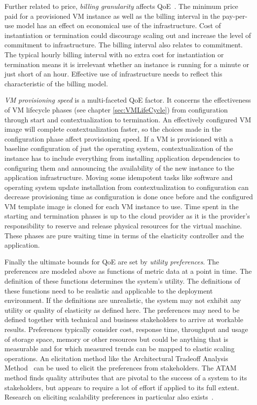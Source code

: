 \documentclass[english]{tktltiki2}
\theoremstyle{definition}
\theoremstyle{remark}
\begin{document}
Further related to price, \textit{billing granularity} affects
QoE~\cite{Brebner2012a}\cite{Islam2012}\cite{Mao2011}\cite{VandenBossche2010}.
The minimum price paid for a provisioned VM instance as well as the billing
interval in the pay-per-use model has an effect on economical use of the
infrastructure. Cost of instantiation or termination could discourage scaling
out and increase the level of commitment to infrastructure. The billing interval
also relates to commitment. The typical hourly billing interval with no extra
cost for instantiation or termination means it is irrelevant whether an instance
is running for a minute or just short of an hour. Effective use of
infrastructure needs to reflect this characteristic of the billing model.

\textit{VM provisioning speed} is a multi-faceted QoE factor. It concerns the
effectiveness of VM lifecycle phases (see chapter \ref{sec:VMLifeCycle}) from
configuration through start and contextualization to termination. An effectively
configured VM image will complete contextualization faster, so the choices made
in the configuration phase affect provisioning speed. If a VM is provisioned
with a baseline configuration of just the operating system, contextualization of
the instance has to include everything from installing application dependencies
to configuring them and announcing the availability of the new instance to the
application infrastructure. Moving some idempotent tasks like software and
operating system update installation from contextualization to configuration can
decrease provisioning time as configuration is done once before and the
configured VM template image is cloned for each VM instance to use. Time spent
in the starting and termination phases is up to the cloud provider as it is the
provider's responsibility to reserve and release physical resources for the
virtual machine. These phases are pure waiting time in terms of the elasticity
controller and the application.

Finally the ultimate bounds for QoE are set by \textit{utility preferences}. The
preferences are modeled above as functions of metric data at a point in time.
The definition of these functions determines the system's utility. The
definitions of these functions need to be realistic and applicable to the
deployment environment. If the definitions are unrealistic, the system may not
exhibit any utility or quality of elasticity as defined here. The preferences
may need to be defined together with technical and business stakeholders to
arrive at workable results. Preferences typically consider cost, response time,
throughput and usage of storage space, memory or other resources but could be
anything that is measurable and for which measured trends can be mapped to
elastic scaling operations. An elicitation method like the Architectural
Tradeoff Analysis Method~\cite{ATAM} can be used to elicit the preferences from
stakeholders. The ATAM method finds quality attributes that are pivotal to the
success of a system to its stakeholders, but appears to require a lot of effort
if applied to its full extent. Research on eliciting scalability preferences in particular also exists~\cite{DubocUtility}.
\end{document}
